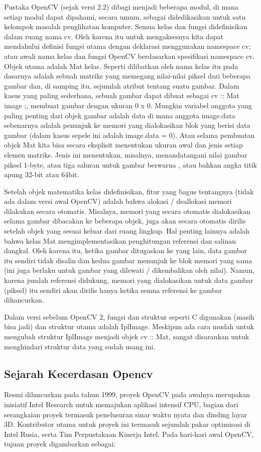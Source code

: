 	Pustaka OpenCV (sejak versi 2.2) dibagi menjadi beberapa modul, di mana setiap modul dapat dipahami, secara umum, sebagai didedikasikan untuk satu kelompok masalah penglihatan komputer. Semua kelas dan fungsi didefinisikan dalam ruang nama cv. Oleh karena itu untuk mengaksesnya kita dapat mendahului definisi fungsi utama dengan deklarasi menggunakan namespace cv; atau awali nama kelas dan fungsi OpenCV berdasarkan spesifikasi namespace cv. Objek utama adalah Mat kelas. Seperti dilibatkan oleh nama kelas itu pada dasarnya adalah sebuah matriks yang memegang nilai-nilai piksel dari beberapa gambar dan, di samping itu, sejumlah atribut tentang suatu gambar. Dalam kasus yang paling sederhana, sebuah gambar dapat dibuat sebagai cv :: Mat image ;, membuat gambar dengan ukuran 0 x 0. Mungkin variabel anggota yang paling penting dari objek gambar adalah data di mana anggota image.data sebenarnya adalah penunjuk ke memori yang dialokasikan blok yang berisi data gambar (dalam kasus sepele ini adalah image.data = 0). Atau selama pembuatan objek Mat kita bisa secara eksplisit menentukan ukuran awal dan jenis setiap elemen matriks. Jenis ini menentukan, misalnya, menandatangani nilai gambar piksel 1-byte, atau tiga saluran untuk gambar berwarna , atau bahkan angka titik apung 32-bit atau 64bit.

	Setelah objek matematika kelas didefinisikan, fitur yang bagus tentangnya (tidak ada dalam versi awal OpenCV) adalah bahwa alokasi / deallokasi memori dilakukan secara otomatis. Misalnya, memori yang secara otomatis dialokasikan selama gambar dibacakan ke beberapa objek, juga akan secara otomatis dirilis setelah objek yang sesuai keluar dari ruang lingkup. Hal penting lainnya adalah bahwa kelas Mat mengimplementasikan penghitungan referensi dan salinan dangkal. Oleh karena itu, ketika gambar ditugaskan ke yang lain, data gambar itu sendiri tidak disalin dan kedua gambar menunjuk ke blok memori yang sama (ini juga berlaku untuk gambar yang dilewati / dikembalikan oleh nilai). Namun, karena jumlah referensi didukung, memori yang dialokasikan untuk data gambar (piksel) itu sendiri akan dirilis hanya ketika semua referensi ke gambar dihancurkan.

	Dalam versi sebelum OpenCV 2, fungsi dan struktur seperti C digunakan (masih bisa jadi) dan struktur utama adalah IplImage. Meskipun ada cara mudah untuk mengubah struktur IplImage menjadi objek cv :: Mat, sangat disarankan untuk menghindari struktur data yang sudah usang ini.

\subsection{Sejarah Kecerdasan Opencv}
    Resmi diluncurkan pada tahun 1999, proyek OpenCV pada awalnya merupakan inisiatif Intel Research untuk memajukan aplikasi intensif CPU, bagian dari serangkaian proyek termasuk penelusuran sinar waktu nyata dan dinding layar 3D. Kontributor utama untuk proyek ini termasuk sejumlah pakar optimisasi di Intel Rusia, serta Tim Perpustakaan Kinerja Intel. Pada hari-hari awal OpenCV, tujuan proyek digambarkan sebagai:

